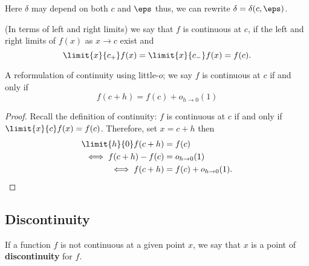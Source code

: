\documentclass[12pt, a4paper]{article}
\begin{document}
\begin{mdnote}
    Here \(\delta\) may depend on both \(c\) and \(\eps\) thus, we can rewrite \(\delta=\delta(c,\eps)\).
\end{mdnote}

\begin{theorem}
    (In terms of left and right limits) we say that \(f\) is continuous at \(c\), if the left and right limits of \(f(x)\) as \(x\to c\) exist and \[\limit{x}{{c}_+} f(x) =\limit{x}{{c}_-} f(x) =f(c).\]
\end{theorem}

\begin{mdthm}
    A reformulation of continuity using little-\(o\); we say \(f\)  is continuous at \(c\) if and only if 
    \[f(c+h) = f(c)+o_{h\to 0}(1)\]
\end{mdthm}

\begin{proof}
    Recall the definition of continuity: \(f\) is continuous at \(c\) if and only if \(\limit{x}{c} f(x)=f(c)\). Therefore, set \(x=c+h\) then 
    \[\begin{aligned}
        \limit{h}{0} f(c+h)&=f(c)\\
        \iff f(c+h)-f(c) &= o_{h\to 0}(1)\\
        \iff f(c+h) &= f(c)+o_{h\to 0}(1).
    \end{aligned}\]
\end{proof}

\subsection{Discontinuity}

\begin{definition}
    If a function \(f\) is not continuous at a given point \(x\), we say that \(x\) is a point of \textbf{discontinuity} for \(f\).
\end{definition}
\end{document}

